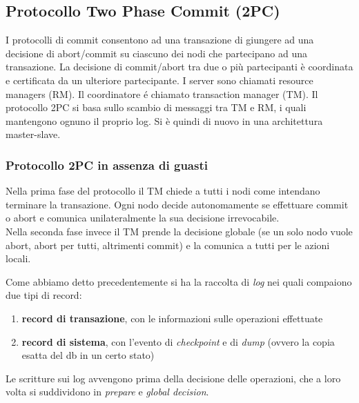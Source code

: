 \subsection{Protocollo Two Phase Commit (2PC)}
I protocolli di commit consentono ad una transazione di giungere ad una decisione di abort/commit su ciascuno dei nodi che partecipano ad una transazione. La decisione di commit/abort tra due o più partecipanti è coordinata e certificata da un ulteriore partecipante. I server sono chiamati resource managers (RM). Il coordinatore é chiamato transaction manager (TM). Il protocollo 2PC si basa sullo scambio di messaggi tra TM e RM, i quali mantengono ognuno il proprio log. Si è quindi di nuovo in una architettura master-slave.

\subsubsection{Protocollo 2PC in assenza di guasti}
Nella prima fase del protocollo il TM chiede a tutti i nodi come intendano terminare la transazione. Ogni nodo decide autonomamente se effettuare commit o abort e comunica unilateralmente la sua decisione irrevocabile. \\
Nella seconda fase invece il TM prende la decisione globale (se un solo nodo vuole abort, abort per tutti, altrimenti commit) e la comunica a tutti per le azioni locali.

Come abbiamo detto precedentemente si ha la raccolta di \textit{log} nei quali compaiono due tipi di record:
\begin{enumerate}
  \item \textbf{record di transazione}, con le informazioni sulle operazioni effettuate
  \item \textbf{record di sistema}, con l'evento di \textit{checkpoint} e di \textit{dump} (ovvero la copia esatta del db in un certo stato)
\end{enumerate}
Le scritture sui log avvengono prima della decisione delle operazioni, che a loro volta si suddividono in \textit{prepare} e \textit{global decision}.

